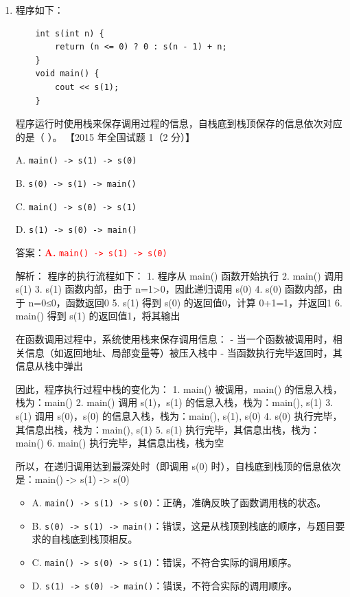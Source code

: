 \documentclass[lang=cn,newtx,10pt,scheme=chinese]{../../../elegantbook}
\begin{document}
\begin{enumerate}
    \item 程序如下：
    \begin{verbatim}
    int s(int n) {
        return (n <= 0) ? 0 : s(n - 1) + n;
    }
    void main() {
        cout << s(1);
    }
    \end{verbatim}
    程序运行时使用栈来保存调用过程的信息，自栈底到栈顶保存的信息依次对应的是（ ）。  
    【2015 年全国试题 1（2 分）】  

    A. \texttt{main() -> s(1) -> s(0)}  

    B. \texttt{s(0) -> s(1) -> main()}  

    C. \texttt{main() -> s(0) -> s(1)}  

    D. \texttt{s(1) -> s(0) -> main()}  

    答案：\textcolor{red}{\textbf{A.} \texttt{main() -> s(1) -> s(0)}}

    解析：
    程序的执行流程如下：
    1. 程序从 main() 函数开始执行
    2. main() 调用 s(1)
    3. s(1) 函数内部，由于 n=1>0，因此递归调用 s(0)
    4. s(0) 函数内部，由于 n=0≤0，函数返回0
    5. s(1) 得到 s(0) 的返回值0，计算 0+1=1，并返回1
    6. main() 得到 s(1) 的返回值1，将其输出

    在函数调用过程中，系统使用栈来保存调用信息：
    - 当一个函数被调用时，相关信息（如返回地址、局部变量等）被压入栈中
    - 当函数执行完毕返回时，其信息从栈中弹出

    因此，程序执行过程中栈的变化为：
    1. main() 被调用，main() 的信息入栈，栈为：main()
    2. main() 调用 s(1)，s(1) 的信息入栈，栈为：main(), s(1)
    3. s(1) 调用 s(0)，s(0) 的信息入栈，栈为：main(), s(1), s(0)
    4. s(0) 执行完毕，其信息出栈，栈为：main(), s(1)
    5. s(1) 执行完毕，其信息出栈，栈为：main()
    6. main() 执行完毕，其信息出栈，栈为空

    所以，在递归调用达到最深处时（即调用 s(0) 时），自栈底到栈顶的信息依次是：main() -> s(1) -> s(0)

    \begin{itemize}
        \item A. \texttt{main() -> s(1) -> s(0)}：正确，准确反映了函数调用栈的状态。
        \item B. \texttt{s(0) -> s(1) -> main()}：错误，这是从栈顶到栈底的顺序，与题目要求的自栈底到栈顶相反。
        \item C. \texttt{main() -> s(0) -> s(1)}：错误，不符合实际的调用顺序。
        \item D. \texttt{s(1) -> s(0) -> main()}：错误，不符合实际的调用顺序。
    \end{itemize}


\end{enumerate}
\end{document}
